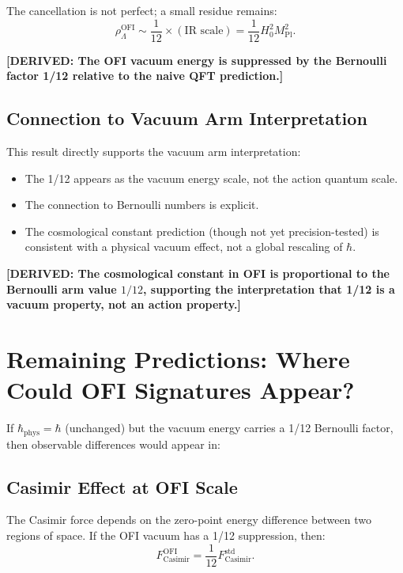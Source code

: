 \documentclass[12pt]{article}
\theoremstyle{definition}
\newcommand{\Mpl}{M_{\mathrm{Pl}}}
\newcommand{\rhoLambda}{\rho_\Lambda}
\newcommand{\DERIVED}[1]{\textcolor{derivedcolor}{\textbf{[DERIVED: #1]}}}
\begin{document}
The cancellation is not perfect; a small residue remains:
\begin{equation}
  \rhoLambda^{\mathrm{OFI}} \sim \frac{1}{12} \times (\text{IR scale}) = \frac{1}{12} H_0^2 \Mpl^2.
\end{equation}

\DERIVED{The OFI vacuum energy is suppressed by the Bernoulli factor 1/12 relative to
the naive QFT prediction.}

\subsection{Connection to Vacuum Arm Interpretation}

This result directly supports the vacuum arm interpretation:
\begin{itemize}
  \item The 1/12 appears as the vacuum energy scale, not the action quantum scale.
  \item The connection to Bernoulli numbers is explicit.
  \item The cosmological constant prediction (though not yet precision-tested) is
    consistent with a physical vacuum effect, not a global rescaling of $\hbar$.
\end{itemize}

\DERIVED{The cosmological constant in OFI is proportional to the Bernoulli arm value
$1/12$, supporting the interpretation that 1/12 is a vacuum property, not an action
property.}

\section{Remaining Predictions: Where Could OFI Signatures Appear?}
\label{sec:remaining}

If $\hbar_{\mathrm{phys}} = \hbar$ (unchanged) but the vacuum energy carries a 1/12
Bernoulli factor, then observable differences would appear in:

\subsection{Casimir Effect at OFI Scale}

The Casimir force depends on the zero-point energy difference between two regions of space.
If the OFI vacuum has a 1/12 suppression, then:
\begin{equation}
  F_{\mathrm{Casimir}}^{\mathrm{OFI}} = \frac{1}{12} F_{\mathrm{Casimir}}^{\mathrm{std}}.
\end{equation}
\end{document}
